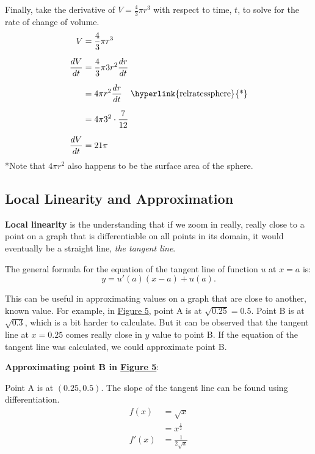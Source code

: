 \documentclass[12pt]{article}
\begin{document}
\begin{enumerate}
          \noindent Finally, take the derivative of $V = \frac{4}{3} \pi r^3$ with respect to time, $t$, to solve for the rate of change of volume.
          \begin{align*}
              V             & = \frac{4}{3} \pi r^3                                                \\[6pt]
              \frac{dV}{dt} & = \frac{4}{3} \pi 3r^2 \frac{dr}{dt}                                 \\[6pt]
                            & = 4 \pi r^2 \frac{dr}{dt} \quad \text{\hyperlink{relratessphere}{*}} \\[6pt]
                            & = 4 \pi 3^2 \cdot \frac{7}{12}                                       \\[6pt]
              \frac{dV}{dt} & = 21 \pi
          \end{align*}
          \hypertarget{relratessphere}{*}Note that $4 \pi r^2$ also happens to be the surface area of the sphere.
\end{enumerate}

\subsection{Local Linearity and Approximation}
\textbf{Local linearity} is the understanding that if we zoom in really, really close to a point on a graph that is differentiable on all points in its domain, it would eventually be a straight line, \textit{the tangent line}.

\noindent The general formula for the equation of the tangent line of function $u$ at $x=a$ is:
\[ y=u'(a)(x-a) + u(a). \]

This can be useful in approximating values on a graph that are close to another, known value. For example, in \hyperref[fig:locallinapprox]{Figure 5}, point A is at $\sqrt{0.25} = 0.5$. Point B is at $\sqrt{0.3}$, which is a bit harder to calculate. But it can be observed that the tangent line at $x=0.25$ comes really close in $y$ value to point B. If the equation of the tangent line was calculated, we could approximate point B.

\noindent \textbf{Approximating point B in \hyperref[fig:locallinapprox]{Figure 5}}:

\noindent Point A is at $(0.25, 0.5)$. The slope of the tangent line can be found using differentiation.
\begin{align*}
    f(x)  & = \sqrt{x}            \\
          & = x^{\frac{1}{2}}     \\
    f'(x) & = \frac{1}{2\sqrt{x}}
\end{align*}
\end{document}
